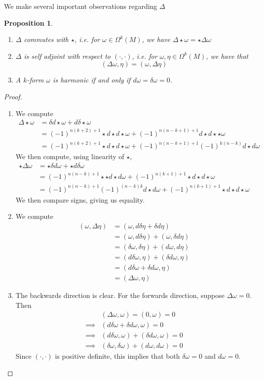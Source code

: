 \documentclass[psamsfonts]{amsart}
\newtheorem{prop}[thm]{Proposition}
\theoremstyle{definition}
\theoremstyle{remark}
\newcommand{\enumbreak}{\ \\ \vspace{-\baselineskip}}
\begin{document}
We make several important observations regarding $\Delta$
\begin{prop}\enumbreak
\begin{enumerate}
\item $\Delta$ commutes with $\star$, i.e. for $\omega \in \Omega^k(M)$, we have $\Delta\star\omega = \star\Delta\omega$
\item $\Delta$ is self adjoint with respect to $(\cdot,\cdot)$, i.e. for $\omega,\eta \in \Omega^k(M)$, we have that
$$(\Delta\omega, \eta ) = (\omega, \Delta\eta)$$
\item A $k$-form $\omega$ is harmonic if and only if $d\omega = \delta\omega = 0$.
\end{enumerate}
\end{prop}
\begin{proof}\enumbreak
\begin{enumerate}
\item We compute
\begin{align*}
\Delta\star\omega &= \delta d\star\omega + d\delta\star\omega \\
&= (-1)^{n(k+2) + 1}\star d\star d\star \omega + (-1)^{n(n-k+1)+1}d\star d\star\star\omega \\
&= (-1)^{n(k+2) + 1}\star d\star d\star \omega + (-1)^{n(n-k+1)+1}(-1)^{k(n-k)}d\star d\omega
\end{align*}
We then compute, using linearity of $\star$,
\begin{align*}
\star\Delta\omega &= \star \delta d\omega + \star d\delta\omega \\
&= (-1)^{n(n-k)+1}\star\star d\star d\omega + (-1)^{n(k+1)+1} \star d\star d \star \omega \\
&= (-1)^{n(n-k)+1}(-1)^{(n-k)k} d\star d\omega + (-1)^{n(k+1)+1} \star d\star d \star \omega
\end{align*}
We then compare signs, giving us equality.
\item We compute
\begin{align*}
(\omega, \Delta\eta) &= (\omega, d\delta\eta + \delta d\eta) \\
&= (\omega, d\delta\eta) + (\omega, \delta d\eta) \\
&= (\delta\omega,\delta\eta) + (d\omega,d\eta)  \\
&= (d\delta\omega,\eta) + (\delta d\omega,\eta) \\
&= (d\delta\omega + \delta d\omega,\eta) \\
&= (\Delta\omega,\eta)
\end{align*}
\item The backwards direction is clear. For the forwards direction, suppose $\Delta \omega = 0$. Then
\begin{align*}
&(\Delta\omega,\omega) = (0,\omega) = 0 \\
\implies &(d\delta\omega + \delta d\omega,\omega) = 0 \\
\implies &(d\delta\omega,\omega) + (\delta d\omega,\omega) = 0\\
\implies &(\delta\omega,\delta\omega) + (d\omega,d\omega) = 0
\end{align*}
Since $(\cdot,\cdot)$ is positive definite, this implies that both $\delta\omega = 0$ and $d\omega = 0$.
\end{enumerate}
\end{proof}
\end{document}
